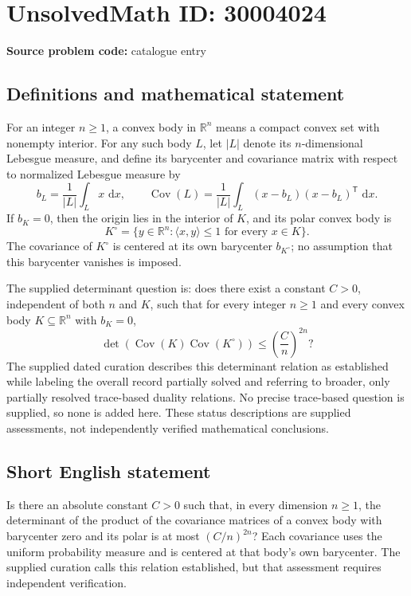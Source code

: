 \documentclass[11pt]{article}
\newcommand{\R}{\mathbb{R}}
\newcommand{\dd}{\,\mathrm{d}}
\begin{document}
\section*{UnsolvedMath ID: 30004024}
\textbf{Source problem code:} catalogue entry
\subsection{Definitions and mathematical statement}
For an integer \(n\geq 1\), a convex body in \(\R^n\) means a compact convex set with nonempty interior. For any such body \(L\), let \(|L|\) denote its \(n\)-dimensional Lebesgue measure, and define its barycenter and covariance matrix with respect to normalized Lebesgue measure by
\[
b_L=\frac{1}{|L|}\int_L x\,\dd x,
\qquad
\operatorname{Cov}(L)=\frac{1}{|L|}\int_L (x-b_L)(x-b_L)^{\mathsf T}\,\dd x.
\]
If \(b_K=0\), then the origin lies in the interior of \(K\), and its polar convex body is
\[
K^\circ=\{y\in\R^n:\langle x,y\rangle\leq 1\text{ for every }x\in K\}.
\]
The covariance of \(K^\circ\) is centered at its own barycenter \(b_{K^\circ}\); no assumption that this barycenter vanishes is imposed.

The supplied determinant question is: does there exist a constant \(C>0\), independent of both \(n\) and \(K\), such that for every integer \(n\geq 1\) and every convex body \(K\subseteq\R^n\) with \(b_K=0\),
\[
\det\!\left(\operatorname{Cov}(K)\operatorname{Cov}(K^\circ)\right)
\leq \left(\frac{C}{n}\right)^{2n}?
\]
The supplied dated curation describes this determinant relation as established while labeling the overall record partially solved and referring to broader, only partially resolved trace-based duality relations. No precise trace-based question is supplied, so none is added here. These status descriptions are supplied assessments, not independently verified mathematical conclusions.
\subsection{Short English statement}
Is there an absolute constant \(C>0\) such that, in every dimension \(n\geq 1\), the determinant of the product of the covariance matrices of a convex body with barycenter zero and its polar is at most \((C/n)^{2n}\)? Each covariance uses the uniform probability measure and is centered at that body's own barycenter. The supplied curation calls this relation established, but that assessment requires independent verification.
\end{document}
